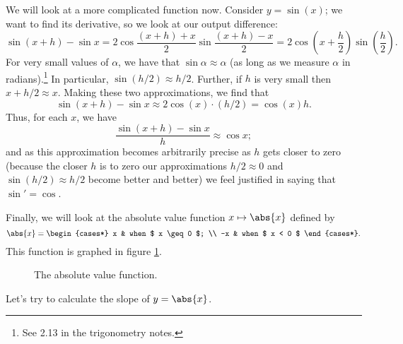 We will look at a more complicated function now. Consider $ y = \sin(x) $; we want to find its derivative, so we look at our
output difference:
\begin{displaymath}
  \sin (x + h) - \sin x = 2\cos \frac{(x + h) + x}{2} \sin \frac{(x + h) - x}{2} = 2\cos \left(x + \frac{h}{2} \right) \sin \left( \frac{h}{2} \right).
\end{displaymath}
For very small values of $ \alpha $, we have that $ \sin \alpha \approx \alpha $ (as long as we measure $ \alpha $ in radians).\footnote{See 2.13
in the trigonometry notes.} In particular, $ \sin(h/2) \approx h/2 $. Further, if $ h $ is very small then $ x + h/2 \approx x $. Making these
two approximations, we find that
\begin{displaymath}
  \sin (x + h) - \sin x \approx 2\cos(x) \cdot (h/2) = \cos(x) h.
\end{displaymath}
Thus, for each $ x $, we have
\begin{equation}
  \frac{\sin (x + h) - \sin x}{h} \approx \cos x;
\end{equation}
and as this approximation becomes arbitrarily precise as $ h $ gets closer to zero (because the closer $ h $ is to zero our
approximations $ h/2 \approx 0 $ and $ \sin(h/2) \approx h/2 $ become better and better) we feel justified in saying that $ \sin' = \cos $.

Finally, we will look at the absolute value function $ x \mapsto \abs{x} $ defined by
\begin{displaymath}
  \abs{x} = \begin{cases*} x & when $ x \geq 0 $; \\ -x & when $ x < 0 $ \end{cases*}.
\end{displaymath}
This function is graphed in figure \ref{fig:func3}.

\begin{figure}\centering
  \caption{The absolute value function.\label{fig:func3}}
\end{figure}

Let's try to calculate the slope of $ y = \abs{x} $.

